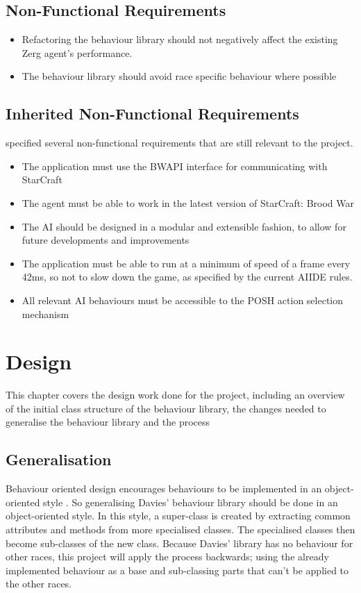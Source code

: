 \documentclass[11pt,openright,a4paper]{report}
\begin{document}
\section{Non-Functional Requirements}
\begin{itemize}
\item{Refactoring the behaviour library should not negatively affect the existing Zerg agent's performance.}
\item{The behaviour library should avoid race specific behaviour where possible}
\end{itemize}

\section{Inherited Non-Functional Requirements}
 specified several non-functional requirements that are still relevant to the project.
\begin{itemize}
\item{The application must use the BWAPI interface for communicating with StarCraft}
\item{The agent must be able to work in the latest version of StarCraft: Brood War}
\item{The AI should be designed in a modular and extensible fashion, to allow for future developments and improvements}
\item{The application must be able to run at a minimum of speed of a frame every 42ms, so not to slow down the game, as specified by the current AIIDE rules.}
\item{All relevant AI behaviours must be accessible to the POSH action selection mechanism}
\end{itemize}


\chapter{Design}
This chapter covers the design work done for the project, including an overview of the initial class structure of the behaviour library, the changes needed to generalise the behaviour library and the process

\section{Generalisation}
Behaviour oriented design encourages behaviours to be implemented in an object-oriented style \cite{bryson2003behavior}. So generalising Davies' behaviour library should be done in an object-oriented style. In this style, a super-class is created by extracting common attributes and methods from more specialised classes. The specialised classes then become sub-classes of the new class. Because Davies' library has no behaviour for other races, this project will apply the process backwards; using the already implemented behaviour as a base and sub-classing parts that can't be applied to the other races.
\end{document}
